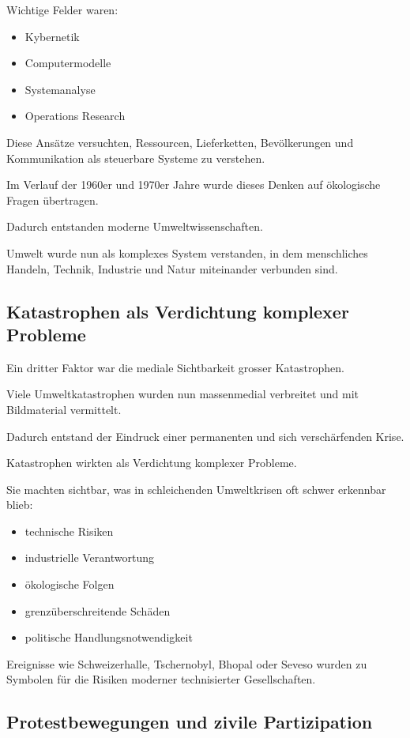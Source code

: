 Wichtige Felder waren:

\begin{itemize}
\item Kybernetik
\item Computermodelle
\item Systemanalyse
\item Operations Research
\end{itemize}

Diese Ansätze versuchten,
Ressourcen,
Lieferketten,
Bevölkerungen
und Kommunikation
als steuerbare Systeme zu verstehen.

Im Verlauf der 1960er und 1970er Jahre
wurde dieses Denken auf ökologische Fragen übertragen.

Dadurch entstanden moderne Umweltwissenschaften.

Umwelt wurde nun als komplexes System verstanden,
in dem menschliches Handeln,
Technik,
Industrie
und Natur miteinander verbunden sind.

\subsection{Katastrophen als Verdichtung komplexer Probleme}

Ein dritter Faktor war die mediale Sichtbarkeit
grosser Katastrophen.

Viele Umweltkatastrophen
wurden nun massenmedial verbreitet
und mit Bildmaterial vermittelt.

Dadurch entstand der Eindruck
einer permanenten
und sich verschärfenden Krise.

Katastrophen wirkten als Verdichtung
komplexer Probleme.

Sie machten sichtbar,
was in schleichenden Umweltkrisen
oft schwer erkennbar blieb:

\begin{itemize}
\item technische Risiken
\item industrielle Verantwortung
\item ökologische Folgen
\item grenzüberschreitende Schäden
\item politische Handlungsnotwendigkeit
\end{itemize}

Ereignisse wie Schweizerhalle,
Tschernobyl,
Bhopal
oder Seveso wurden zu Symbolen
für die Risiken moderner technisierter Gesellschaften.

\subsection{Protestbewegungen und zivile Partizipation}

